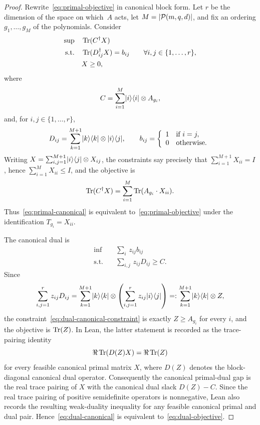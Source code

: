 \begin{proof}
  \leanok
  Rewrite~\eqref{eq:primal-objective} in canonical block form. Let $r$ be the dimension of the space on which~$A$ acts, let $M = |\mathcal{P}(m,q,d)|$, and fix an ordering $g_1,\ldots,g_M$ of the polynomials. Consider
  \begin{align}
    \sup &\quad \operatorname{Tr}(C^\dagger X) \label{eq:primal-canonical}\\
    \text{s.t.} &\quad \operatorname{Tr}(D_{ij}^\dagger X) = b_{ij} \qquad\forall i,j\in\{1,\ldots,r\}, \notag\\
    &\quad X \geq 0, \notag
  \end{align}
  where
  \[
    C = \sum_{i = 1}^M \lvert i \rangle\langle i \rvert \otimes A_{g_i},
  \]
  and, for $i,j \in \{1,\ldots,r\}$,
  \[
    D_{ij} = \sum_{k=1}^{M+1} \lvert k \rangle\langle k \rvert \otimes \lvert i \rangle\langle j \rvert,
    \qquad
    b_{ij}  = \left\{\begin{array}{rl}
      1 & \text{if } i = j,\\
      0 & \text{otherwise}.
    \end{array}\right.
  \]
  Writing $X=\sum_{i,j=1}^{M+1}\lvert i \rangle\langle j \rvert\otimes X_{ij}$, the constraints say precisely that $\sum_{i=1}^{M+1} X_{ii}=I$, hence $\sum_{i=1}^{M}X_{ii}\le I$, and the objective is
  \[
    \operatorname{Tr}(C^\dagger X)=\sum_{i=1}^M \operatorname{Tr}(A_{g_i}\cdot X_{ii}).
  \]
  Thus~\eqref{eq:primal-canonical} is equivalent to~\eqref{eq:primal-objective} under the identification $T_{g_i}=X_{ii}$.

  The canonical dual is
  \begin{align}
    \inf &\quad \sum_i\, z_{ij} b_{ij} \label{eq:dual-canonical}\\
    \text{s.t.} &\quad  \sum_{i,j} \,z_{ij} D_{ij} \geq C. \label{eq:dual-canonical-constraint}
  \end{align}
  Since
  \[
    \sum_{i,j=1}^r z_{ij} D_{ij}
    = \sum_{k=1}^{M+1} \lvert k \rangle\langle k \rvert \otimes \left(\sum_{i,j=1}^r z_{ij}\lvert i \rangle\langle j \rvert\right)
    =: \sum_{k=1}^{M+1}\lvert k \rangle\langle k \rvert \otimes Z,
  \]
  the constraint~\eqref{eq:dual-canonical-constraint} is exactly $Z\ge A_{g_i}$ for every $i$, and the objective is $\operatorname{Tr}(Z)$.  In Lean, the latter statement is recorded as the trace-pairing identity
  \[
    \Re\operatorname{Tr}(D(Z)X)=\Re\operatorname{Tr}(Z)
  \]
  for every feasible canonical primal matrix \(X\), where \(D(Z)\) denotes the
  block-diagonal canonical dual operator.  Consequently the canonical
  primal-dual gap is the real trace pairing of \(X\) with the canonical dual
  slack \(D(Z)-C\).  Since the real trace pairing of positive semidefinite
  operators is nonnegative, Lean also records the resulting weak-duality
  inequality for any feasible canonical primal and dual pair.
  Hence~\eqref{eq:dual-canonical} is equivalent to~\eqref{eq:dual-objective}.


\end{proof}
